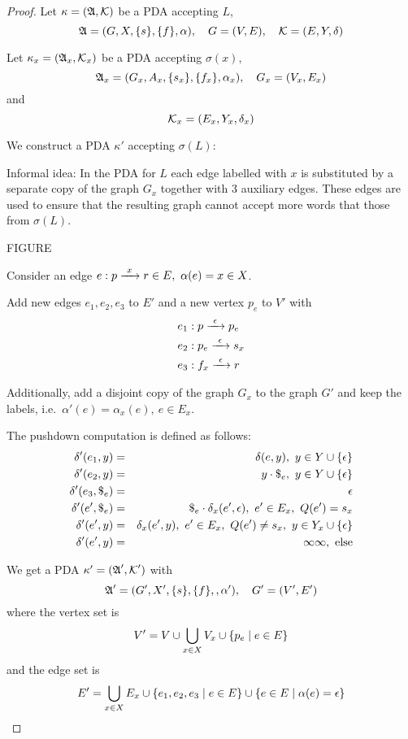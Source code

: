 \begin{proof}
Let $\kappa = (\mbox{$\mathfrak{A}$}, \mbox{$\mathcal{K}$})$ be a PDA accepting $L$,
\[ \mbox{$\mathfrak{A}$}=(G, X, \mbox{$\{s\}$}, \mbox{$\{f\}$}, \alpha),\quad G=(V,E),\quad
\mbox{$\mathcal{K}$}=(E, Y, \delta)
\]

Let $\kappa_x = (\mbox{$\mathfrak{A}$}_x, \mbox{$\mathcal{K}$}_x)$ be a PDA accepting $\sigma(x)$,
\[ \mbox{$\mathfrak{A}$}_x = (G_x, A_x, \mbox{$\{s_x\}$}, \mbox{$\{f_x\}$}, \alpha_x),\quad G_x=(V_x,
E_x) \] and
\[ \mbox{$\mathcal{K}$}_x = (E_x, Y_x, \delta_x) \]

We construct a PDA $\kappa'$ accepting $\sigma(L)$:

Informal idea: In the PDA for $L$ each edge labelled with $x$ is substituted by
a separate copy of the graph $G_x$ together with 3 auxiliary edges. These edges
are used to ensure that the resulting graph cannot accept more words that those
from $\sigma(L)$.

FIGURE

Consider an edge $e: p \edge{x} r \in E,\ \alpha(e)=x\in X$.

Add new edges $e_1, e_2, e_3$ to $E'$ and a new vertex $p_e$ to $V'$ with
\begin{eqnarray*}
& e_1: p \xrightarrow{\ {\epsilon}\ } p_e \\
& e_2: p_e \xrightarrow{\ {\epsilon}\ } s_x \\
& e_3: f_x \xrightarrow{\ {\epsilon}\ } r
\end{eqnarray*}

Additionally, add a disjoint copy of the graph $G_x$ to the graph $G'$ and keep
the labels, i.e.\ $\alpha'(e) = \alpha_x(e),\ e\in E_x$.

The pushdown computation is defined as follows:
\begin{eqnarray*}
\delta'(e_1, y) &=& \delta(e, y),\ y\in Y\cup\setof{\epsilon} \\
\delta'(e_2, y) &=& y \cdot {\$}_e,\ y\in Y\cup\setof{\epsilon} \\
\delta'(e_3, {\$}_e) &=& \epsilon \\
\delta'(e', {\$}_e) &=& {\$}_e \cdot \delta_x(e', \epsilon),\ e'\in E_x,\ Q(e')
=s_x \\
\delta'(e', y) &=& \delta_x(e', y),\ e'\in E_x,\ Q(e')\neq s_x,\ y\in Y_x \cup
\setof{\epsilon} \\
\delta'(e', y) &=& \infty\infty,\text{ else}
\end{eqnarray*}

We get a PDA $\kappa' = (\mbox{$\mathfrak{A}$}', \mbox{$\mathcal{K}$}')$ with
\[ \mbox{$\mathfrak{A}$}' = (G', X', \mbox{$\{s\}$}, \mbox{$\{f\}$}, ,\alpha'),\quad G'=(V',E') \]
where the vertex set is
\[ V' = V \cup \bigcup_{x \in X} V_x \cup \mbox{$\{p_e \mid e \in E\}$} \]
and the edge set is
\[ E' = \bigcup_{x \in X} E_x \cup \mbox{$\{e_1, e_2, e_3 \mid e \in E\}$} \cup
\mbox{$\{e \in E \mid \alpha(e) = \epsilon\}$} \]


\end{proof}
